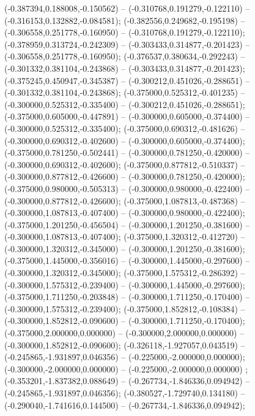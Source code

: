  (-0.387394,0.188008,-0.150562) -- (-0.310768,0.191279,-0.122110) -- (-0.316153,0.132882,-0.084581);
 (-0.382556,0.249682,-0.195198) -- (-0.306558,0.251778,-0.160950) -- (-0.310768,0.191279,-0.122110);
 (-0.378959,0.313724,-0.242309) -- (-0.303433,0.314877,-0.201423) -- (-0.306558,0.251778,-0.160950);
 (-0.376537,0.380634,-0.292243) -- (-0.301332,0.381104,-0.243868) -- (-0.303433,0.314877,-0.201423);
 (-0.375245,0.450947,-0.345387) -- (-0.300212,0.451026,-0.288651) -- (-0.301332,0.381104,-0.243868);
 (-0.375000,0.525312,-0.401235) -- (-0.300000,0.525312,-0.335400) -- (-0.300212,0.451026,-0.288651);
 (-0.375000,0.605000,-0.447891) -- (-0.300000,0.605000,-0.374400) -- (-0.300000,0.525312,-0.335400);
 (-0.375000,0.690312,-0.481626) -- (-0.300000,0.690312,-0.402600) -- (-0.300000,0.605000,-0.374400);
 (-0.375000,0.781250,-0.502441) -- (-0.300000,0.781250,-0.420000) -- (-0.300000,0.690312,-0.402600);
 (-0.375000,0.877812,-0.510337) -- (-0.300000,0.877812,-0.426600) -- (-0.300000,0.781250,-0.420000);
 (-0.375000,0.980000,-0.505313) -- (-0.300000,0.980000,-0.422400) -- (-0.300000,0.877812,-0.426600);
 (-0.375000,1.087813,-0.487368) -- (-0.300000,1.087813,-0.407400) -- (-0.300000,0.980000,-0.422400);
 (-0.375000,1.201250,-0.456504) -- (-0.300000,1.201250,-0.381600) -- (-0.300000,1.087813,-0.407400);
 (-0.375000,1.320312,-0.412720) -- (-0.300000,1.320312,-0.345000) -- (-0.300000,1.201250,-0.381600);
 (-0.375000,1.445000,-0.356016) -- (-0.300000,1.445000,-0.297600) -- (-0.300000,1.320312,-0.345000);
 (-0.375000,1.575312,-0.286392) -- (-0.300000,1.575312,-0.239400) -- (-0.300000,1.445000,-0.297600);
 (-0.375000,1.711250,-0.203848) -- (-0.300000,1.711250,-0.170400) -- (-0.300000,1.575312,-0.239400);
 (-0.375000,1.852812,-0.108384) -- (-0.300000,1.852812,-0.090600) -- (-0.300000,1.711250,-0.170400);
 (-0.375000,2.000000,0.000000) -- (-0.300000,2.000000,0.000000) -- (-0.300000,1.852812,-0.090600);
 (-0.326118,-1.927057,0.043519) -- (-0.245865,-1.931897,0.046356) -- (-0.225000,-2.000000,0.000000);
 (-0.300000,-2.000000,0.000000) -- (-0.225000,-2.000000,0.000000) ;
 (-0.353201,-1.837382,0.088649) -- (-0.267734,-1.846336,0.094942) -- (-0.245865,-1.931897,0.046356);
 (-0.380527,-1.729740,0.134180) -- (-0.290040,-1.741616,0.144500) -- (-0.267734,-1.846336,0.094942);
